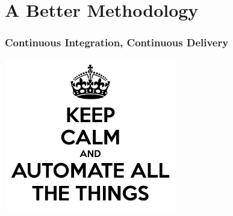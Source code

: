 \documentclass{beamer}
\begin{document}
\section{A Better Methodology}

{
  \begin{frame}[plain]
  \end{frame}
}

\begin{frame}[fragile]
  \frametitle{Continuous Integration, Continuous Delivery}

  \begin{center}
    \includegraphics[height=18em]{keep-calm-and-automate-all-the-things-13.png}
  \end{center}  
\end{frame}
\end{document}
